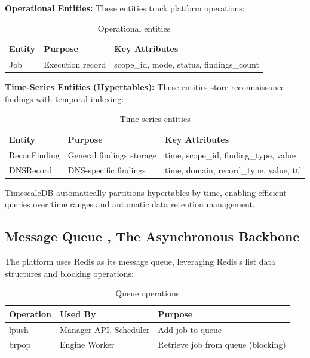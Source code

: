 \documentclass[a4paper,12pt]{report}
\begin{document}
\textbf{Operational Entities:} These entities track platform operations:\hfill \break

\begin{table}[H]
\centering
\caption{Operational entities}
\begin{tabular}{|l|l|l|}
\hline
\textbf{Entity} & \textbf{Purpose} & \textbf{Key Attributes} \\
\hline
Job & Execution record & scope\_id, mode, status, findings\_count \\
\hline
\end{tabular}
\label{tab:operational_entities}
\end{table}

\textbf{Time-Series Entities (Hypertables):} These entities store reconnaissance findings with temporal indexing:\hfill \break

\begin{table}[H]
\centering
\caption{Time-series entities}
\begin{tabular}{|l|l|l|}
\hline
\textbf{Entity} & \textbf{Purpose} & \textbf{Key Attributes} \\
\hline
ReconFinding & General findings storage & time, scope\_id, finding\_type, value \\
\hline
DNSRecord & DNS-specific findings & time, domain, record\_type, value, ttl \\
\hline
\end{tabular}
\label{tab:timeseries_entities}
\end{table}

TimescaleDB automatically partitions hypertables by time, enabling efficient queries over time ranges and automatic data retention management.\hfill \break

\subsection{Message Queue ,  The Asynchronous Backbone}

The platform uses Redis \cite{redis_docs} as its message queue, leveraging Redis's list data structures and blocking operations: \hfill 

\begin{table}[H]
\centering
\caption{Queue operations}
\begin{tabular}{|l|l|l|}
\hline
\textbf{Operation} & \textbf{Used By} & \textbf{Purpose} \\
\hline
lpush & Manager API, Scheduler & Add job to queue \\
\hline
brpop & Engine Worker & Retrieve job from queue (blocking) \\
\hline
\end{tabular}
\label{tab:queue_ops}
\end{table}
\end{document}

